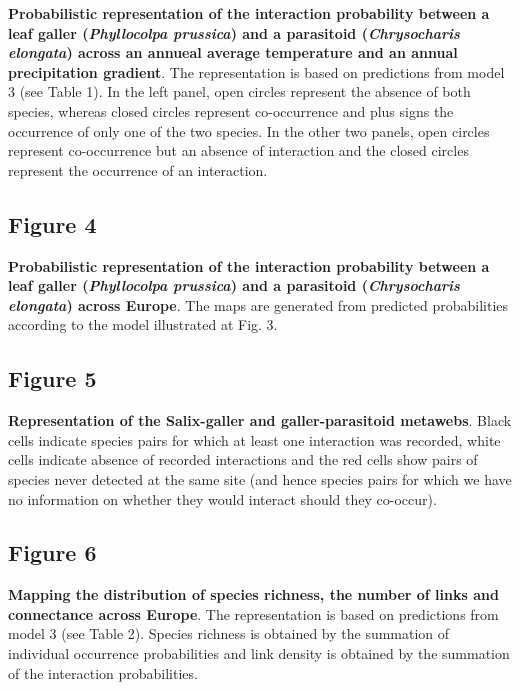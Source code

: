 \documentclass[12pt]{article}
\begin{document}
\textbf{Probabilistic representation of the interaction probability between a
leaf galler (\textit{Phyllocolpa prussica}) and a parasitoid
(\textit{Chrysocharis elongata}) across an annueal average temperature and an
annual precipitation gradient}. The representation is based on predictions
from model 3 (see Table 1). In the left panel, open circles represent the
absence of both species, whereas closed circles represent co-occurrence and
plus signs the occurrence of only one of the two species. In the other two
panels, open circles represent co-occurrence but an absence of interaction and
the closed circles represent the occurrence of an interaction.

\subsection*{Figure 4}

\textbf{Probabilistic representation of the interaction probability between a
leaf galler (\textit{Phyllocolpa prussica}) and a parasitoid
(\textit{Chrysocharis elongata}) across Europe}. The maps are generated from
predicted probabilities according to the model illustrated at Fig. 3.

\subsection*{Figure 5}

\textbf{Representation of the Salix-galler and galler-parasitoid metawebs}.
Black cells indicate species pairs for which at least one interaction was
recorded, white cells indicate absence of recorded interactions and the red
cells show pairs of species never detected at the same site (and hence species
pairs for which we have no information on whether they would interact should
they co-occur).

\subsection*{Figure 6}

\textbf{Mapping the distribution of species richness, the number of links and
connectance across Europe}. The representation is based on predictions from
model 3 (see Table 2). Species richness is obtained by the summation of
individual occurrence probabilities and link density is obtained by the
summation of the interaction probabilities.

\newpage
\end{document}
